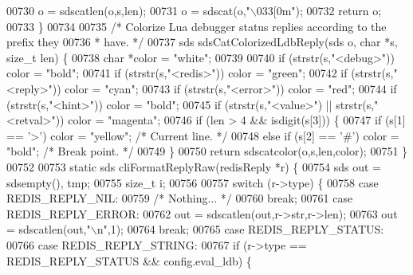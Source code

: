 \begin{DoxyCode}
{{{{{{{{{{{{{{{{{{{{{{00730     o = sdscatlen(o,s,len);
00731     o = sdscat(o,\textcolor{stringliteral}{"\(\backslash\)033[0m"});
00732     \textcolor{keywordflow}{return} o;
00733 \}
00734 
00735 \textcolor{comment}{/* Colorize Lua debugger status replies according to the prefix they}
00736 \textcolor{comment}{ * have. */}
00737 sds sdsCatColorizedLdbReply(sds o, \textcolor{keywordtype}{char} *s, size\_t len) \{
00738     \textcolor{keywordtype}{char} *color = \textcolor{stringliteral}{"white"};
00739 
00740     \textcolor{keywordflow}{if} (strstr(s,\textcolor{stringliteral}{"<debug>"})) color = \textcolor{stringliteral}{"bold"};
00741     \textcolor{keywordflow}{if} (strstr(s,\textcolor{stringliteral}{"<redis>"})) color = \textcolor{stringliteral}{"green"};
00742     \textcolor{keywordflow}{if} (strstr(s,\textcolor{stringliteral}{"<reply>"})) color = \textcolor{stringliteral}{"cyan"};
00743     \textcolor{keywordflow}{if} (strstr(s,\textcolor{stringliteral}{"<error>"})) color = \textcolor{stringliteral}{"red"};
00744     \textcolor{keywordflow}{if} (strstr(s,\textcolor{stringliteral}{"<hint>"})) color = \textcolor{stringliteral}{"bold"};
00745     \textcolor{keywordflow}{if} (strstr(s,\textcolor{stringliteral}{"<value>"}) || strstr(s,\textcolor{stringliteral}{"<retval>"})) color = \textcolor{stringliteral}{"magenta"};
00746     \textcolor{keywordflow}{if} (len > 4 && isdigit(s[3])) \{
00747         \textcolor{keywordflow}{if} (s[1] == \textcolor{stringliteral}{'>'}) color = \textcolor{stringliteral}{"yellow"}; \textcolor{comment}{/* Current line. */}
00748         \textcolor{keywordflow}{else} \textcolor{keywordflow}{if} (s[2] == \textcolor{stringliteral}{'#'}) color = \textcolor{stringliteral}{"bold"}; \textcolor{comment}{/* Break point. */}
00749     \}
00750     \textcolor{keywordflow}{return} sdscatcolor(o,s,len,color);
00751 \}
00752 
00753 \textcolor{keyword}{static} sds cliFormatReplyRaw(redisReply *r) \{
00754     sds out = sdsempty(), tmp;
00755     size\_t i;
00756 
00757     \textcolor{keywordflow}{switch} (r->type) \{
00758     \textcolor{keywordflow}{case} REDIS\_REPLY\_NIL:
00759         \textcolor{comment}{/* Nothing... */}
00760         \textcolor{keywordflow}{break};
00761     \textcolor{keywordflow}{case} REDIS\_REPLY\_ERROR:
00762         out = sdscatlen(out,r->str,r->len);
00763         out = sdscatlen(out,\textcolor{stringliteral}{"\(\backslash\)n"},1);
00764         \textcolor{keywordflow}{break};
00765     \textcolor{keywordflow}{case} REDIS\_REPLY\_STATUS:
00766     \textcolor{keywordflow}{case} REDIS\_REPLY\_STRING:
00767         \textcolor{keywordflow}{if} (r->type == REDIS\_REPLY\_STATUS && config.eval\_ldb) \{
}}}}}}}}}}}}}}}}}}}}}}
\end{DoxyCode}
